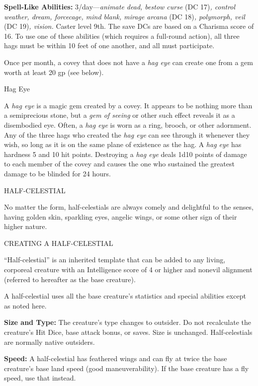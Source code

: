 \documentclass{article}
\begin{document}
\textbf{Spell-Like Abilities:} 3/day---\textit{animate dead, bestow curse }(DC 
17)\textit{, control weather, dream, forcecage, mind blank, mirage arcana }(DC 
18)\textit{, polymorph, veil }(DC 19)\textit{, vision. }Caster level 9th. The save 
DCs are based on a Charisma score of 16. To use one of these abilities (which requires 
a full-round action), all three hags must be within 10 feet of one another, and 
all must participate.

Once per month, a covey that does not have a \textit{hag eye }can create one from 
a gem worth at least 20 gp (see below).

\vspace{12pt}
Hag Eye

A \textit{hag eye }is a magic gem created by a covey. It appears to be nothing 
more than a semiprecious stone, but a \textit{gem of seeing }or other such effect 
reveals it as a disembodied eye. Often, a \textit{hag eye }is worn as a ring, brooch, 
or other adornment. Any of the three hags who created the \textit{hag eye }can 
see through it whenever they wish, so long as it is on the same plane of existence 
as the hag. A \textit{hag eye }has hardness 5 and 10 hit points. Destroying a \textit{hag 
eye }deals 1d10 points of damage to each member of the covey and causes the one 
who sustained the greatest damage to be blinded for 24 hours. 

\vspace{12pt}
{\LARGE{}HALF-CELESTIAL}

No matter the form, half-celestials are always comely and delightful to the senses, 
having golden skin, sparkling eyes, angelic wings, or some other sign of their 
higher nature. 

CREATING A HALF-CELESTIAL

``Half-celestial'' is an inherited template that can be added to any living, corporeal 
creature with an Intelligence score of 4 or higher and nonevil alignment (referred 
to hereafter as the base creature).

A half-celestial uses all the base creature's statistics and special abilities 
except as noted here.

\textbf{Size and Type:} The creature's type changes to outsider. Do not recalculate 
the creature's Hit Dice, base attack bonus, or saves. Size is unchanged. Half-celestials 
are normally native outsiders.

\textbf{Speed:} A half-celestial has feathered wings and can fly at twice the base 
creature's base land speed (good maneuverability). If the base creature has a fly 
speed, use that instead.
\end{document}
